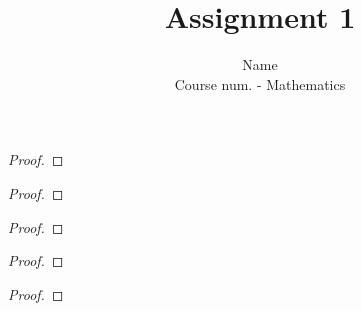\documentclass[10pt]{article}
\newenvironment{Problem}[2][Problem]{\begin{trivlist}
\item[\hskip \labelsep {\bfseries #1}\hskip \labelsep {\bfseries #2.}]}{\end{trivlist}}
\begin{document}
\title{Assignment 1}
\author{Name\\
Course num. - Mathematics}
\maketitle
\begin{Problem}{1}

\end{Problem}
\begin{proof}

\end{proof}



\begin{Problem}{2}

\end{Problem}
\begin{proof}

\end{proof}



\begin{Problem}{3}

\end{Problem}
\begin{proof}

\end{proof}



\begin{Problem}{4}

\end{Problem}
\begin{proof}

\end{proof}



\begin{Problem}{5}

\end{Problem}
\begin{proof}

\end{proof}
\end{document}
